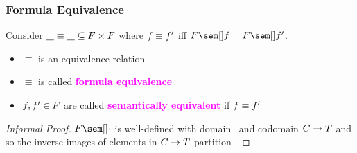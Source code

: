 \documentclass[draft,notes=show,xcolor=dvipsnames]{beamer}
\newcommand*{\placeholder}{\underline{\hspace{8pt}}}
\newcommand*{\vocab}[1]{\textbf{\textcolor{magenta}{#1}}}
\begin{document}
\begin{frame}
  \frametitle{Formula Equivalence}
  \begin{definition}
    Consider $\placeholder \equiv \placeholder \subseteq \fS \times \fS$ where $f \equiv f'$ iff $\fSem{\fE} = \fSem{\fE'}$.
    \begin{itemize}
      \item $\equiv$ is an equivalence relation
      \item $\equiv$ is called \vocab{formula equivalence}
      \item $f, f' \in F$ are called \vocab{semantically equivalent} if $f \equiv f'$
    \end{itemize}
  \end{definition}
  \begin{proof}[Informal Proof]
    $\fSem{\cdot}$ is well-defined with domain \fS\ and codomain $C \to T$ and so the inverse images of elements in $C \to T$ partition \fS.
  \end{proof}
\end{frame}

\renewcommand*{\dimMeta}{\fE}
\end{document}
